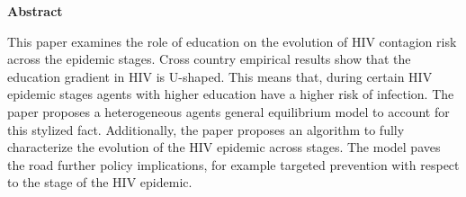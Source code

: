\vspace{2cm}
\begin{center}
\Large{\bf{Abstract}}
\end{center}
\indent This paper examines the role of education on the evolution of HIV contagion risk across the epidemic stages. Cross country empirical results show that the education gradient in HIV is U-shaped. This means that, during certain HIV epidemic stages agents with higher education have a higher risk of infection. The paper proposes a heterogeneous agents general equilibrium model to account for this stylized fact. Additionally, the paper proposes an algorithm to fully characterize the evolution of the HIV epidemic across stages.
The model paves the road further policy implications, for example targeted prevention with respect to the stage of the HIV epidemic. 

